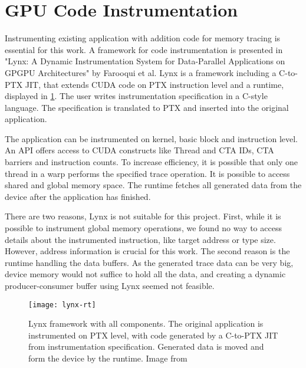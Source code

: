 \section{GPU Code Instrumentation}
Instrumenting existing application with addition code for memory tracing is essential for this work.
A framework for code instrumentation is presented in "Lynx: A Dynamic Instrumentation System for Data-Parallel Applications on GPGPU Architectures" \cite{Farooqui:2012:LDI:2310660.2310989} by Farooqui et al. Lynx is a framework including a C-to-PTX JIT, that extends CUDA code on PTX instruction level and a runtime, displayed in \ref{lynx-rt}. The user writes instrumentation specification in a C-style language. The specification is translated to PTX and inserted into the original application.

The application can be instrumented on kernel, basic block and instruction level. An API offers access to CUDA constructs like Thread and CTA IDs, CTA barriers and instruction counts. To increase
efficiency, it is possible that only one thread in a warp performs the specified trace operation. It is possible to access shared and global memory space. The runtime fetches all generated data from the device after the application has finished.

There are two reasons, Lynx is not suitable for this project. First, while it is possible to instrument global memory operations, we found no way to access details about the instrumented instruction, like target address or type size. However, address information is crucial for this work. The second reason
is the runtime handling the data buffers. As the generated trace data can be very big, device memory would not suffice to hold all the data, and creating a dynamic producer-consumer buffer using Lynx seemed not feasible. 
\begin{figure}[t]
	\centering
	\texttt{[image: lynx-rt]}
	\caption{Lynx framework with all components. The original application is instrumented on PTX level, with code generated by a C-to-PTX JIT from instrumentation specification. Generated data is moved and form the device by the runtime. Image from \cite{Farooqui:2012:LDI:2310660.2310989}}
	\label{lynx-rt}
\end{figure}
